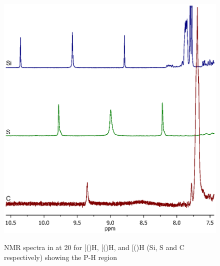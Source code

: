 
\begin{figure}[htb]
\begin{center}
\vspace{0.5cm}
\includegraphics[scale = 0.8, trim = 1.5cm 10cm 4.5cm 5cm, clip]{../NMR/Phosphoniumstacked.eps}
\caption[\proton{} NMR spectra for the [(\tBuxantphos)H\ce{]+} ions]{\proton{} NMR spectra in  at 20 \degC{} for [(\tBusixantphos)H\ce{]+}, [(\tButhixantphos)H\ce{]+}, and [(\tBuxantphos)H\ce{]+} (Si, S and C respectively) showing the P-H region}
\vspace{0.2cm}
\label{Protonatedligandsnmr}
\end{center}
\end{figure}
\vspace{0.2cm}

